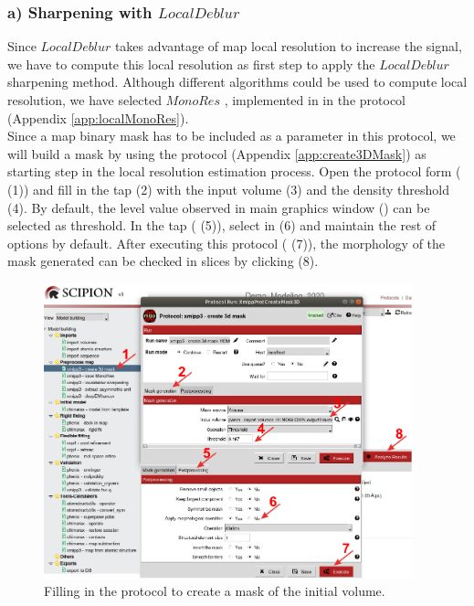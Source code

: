 \subsubsection*{a) Sharpening with $LocalDeblur$}
Since $LocalDeblur$ takes advantage of map local resolution to increase the signal, we have to compute this local resolution as first step to apply the $LocalDeblur$ sharpening method.  Although different algorithms could be used to compute local resolution, we have selected $MonoRes$ \citep{vilas2018}, implemented in \scipion in the protocol   (Appendix \ref{app:localMonoRes}).\\ 
Since a map binary mask has to be included as a parameter in this protocol, we will build a mask by using the \scipion protocol  (Appendix \ref{app:create3DMask}) as starting step in the local resolution estimation process. Open the protocol form ( (1)) and fill in the tap  (2) with the input volume (3) and the density threshold (4). By default, the level value observed in \chimera main  graphics window ()  can be selected as threshold. In the  tap ( (5)), select  in  (6) and maintain the rest of options by default. After executing this protocol ( (7)), the morphology of the mask generated can be checked in slices by clicking  (8).

 
 \begin{figure}[H]
  \centering 
  \captionsetup{width=.9\linewidth} 
  \includegraphics[width=0.95\textwidth]
  {Images/Fig53}
  \caption{Filling in the protocol to create a mask of the initial volume.}
  \label{fig:create3Dmask_1}
  \end{figure}
 
